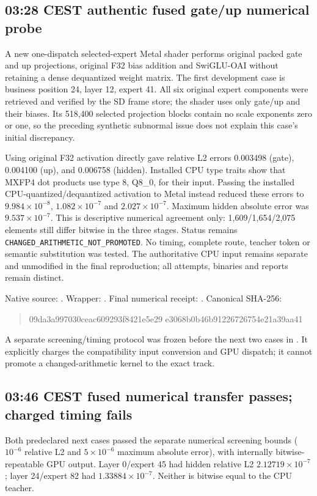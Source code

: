 \subsection{03:28 CEST authentic fused gate/up numerical probe}
A new one-dispatch selected-expert Metal shader performs original packed
gate and up projections, original F32 bias addition and SwiGLU-OAI without
retaining a dense dequantized weight matrix. The first development case is
business position 24, layer 12, expert 41. All six original expert components
were retrieved and verified by the SD frame store; the shader uses only
gate/up and their biases. Its 518,400 selected projection blocks contain no
scale exponents zero or one, so the preceding synthetic subnormal issue
does not explain this case's initial discrepancy.

Using original F32 activation directly gave relative L2 errors 0.003498
(gate), 0.004100 (up), and 0.006758 (hidden). Installed CPU type traits show
that MXFP4 dot products use type 8, Q8\_0, for their input. Passing the
installed CPU-quantized/dequantized activation to Metal instead reduced
these errors to $9.984\times10^{-8}$, $1.082\times10^{-7}$ and
$2.027\times10^{-7}$. Maximum hidden absolute error was
$9.537\times10^{-7}$. This is descriptive numerical agreement only:
1,609/1,654/2,075 elements still differ bitwise in the three stages.
Status remains \texttt{CHANGED\_ARITHMETIC\_NOT\_PROMOTED}.
No timing, complete route, teacher token or semantic substitution was tested.
The authoritative CPU input remains separate and unmodified in the final
reproduction; all attempts, binaries and reports remain distinct.

Native source: .
Wrapper: .
Final numerical receipt:
.
Canonical SHA-256:
\begin{quote}\ttfamily\small
09da3a997030ceac609293f8421e5e29\allowbreak
e3068b0b46b91226726754e21a39aa41
\end{quote}
A separate screening/timing protocol was frozen before the next two cases
in .
It explicitly charges the compatibility input conversion and GPU dispatch;
it cannot promote a changed-arithmetic kernel to the exact track.

\subsection{03:46 CEST fused numerical transfer passes; charged timing fails}
Both predeclared next cases passed the separate numerical screening bounds
($10^{-6}$ relative L2 and $5\times10^{-6}$ maximum absolute error),
with internally bitwise-repeatable GPU output. Layer 0/expert 45 had hidden
relative L2 $2.12719\times10^{-7}$; layer 24/expert 82 had
$1.33884\times10^{-7}$. Neither is bitwise equal to the CPU teacher.

